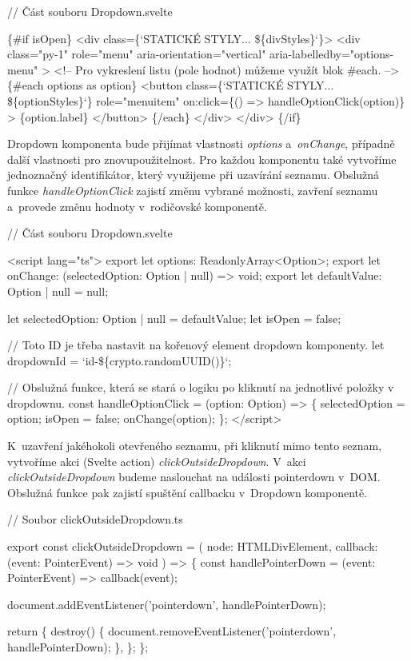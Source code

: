 \begin{prog}
// Část souboru Dropdown.svelte

\{#if isOpen\}
  <div class=\{`STATICKÉ STYLY... \$\{divStyles\}`\}>
    <div 
      class="py-1" role="menu" 
      aria-orientation="vertical" aria-labelledby="options-menu"
    >
      <!-- Pro vykreslení listu (pole hodnot) můžeme využít blok #each. -->
      \{#each options as option\}
        <button
          class=\{`STATICKÉ STYLY... \$\{optionStyles\}`\}
          role="menuitem"
          on:click=\{() => handleOptionClick(option)\}
        >
          \{option.label\}
        </button>
      \{/each\}
    </div>
  </div>
\{/if\}
\end{prog}

Dropdown komponenta bude přijímat vlastnosti \emph{options} a~\emph{onChange}, případně další vlastnosti pro znovupoužitelnost. Pro každou komponentu také vytvoříme jednoznačný identifikátor, který využijeme při uzavírání seznamu.
Obslužná funkce \emph{handleOptionClick} zajistí změnu vybrané možnosti, zavření seznamu a~provede změnu hodnoty v~rodičovské komponentě. 

\begin{prog}
// Část souboru Dropdown.svelte
  
<script lang="ts">
  export let options: ReadonlyArray<Option>;
  export let onChange: (selectedOption: Option | null) => void;
  export let defaultValue: Option | null = null;

  let selectedOption: Option | null = defaultValue;
  let isOpen = false;

  // Toto ID je třeba nastavit na kořenový element dropdown komponenty.
  let dropdownId = `id-\$\{crypto.randomUUID()\}`;

  // Obslužná funkce, která se stará o logiku 
    po kliknutí na jednotlivé položky v dropdownu.
  const handleOptionClick = (option: Option) => \{
    selectedOption = option;
    isOpen = false;
    onChange(option);
  \};
</script>
\end{prog}

K~uzavření jakéhokoli otevřeného seznamu, při kliknutí mimo tento seznam, vytvoříme akci (Svelte action) \emph{clickOutsideDropdown}. 
V~akci \emph{clickOutsideDropdown} budeme naslouchat na události pointerdown v~DOM. Obslužná funkce pak zajistí spuštění callbacku v~Dropdown komponentě.

\begin{prog}
// Soubor clickOutsideDropdown.ts

export const clickOutsideDropdown = (
  node: HTMLDivElement,
  callback: (event: PointerEvent) => void
) => \{
  const handlePointerDown = (event: PointerEvent) => callback(event);

  document.addEventListener('pointerdown', handlePointerDown);

  return \{
    destroy() \{
      document.removeEventListener('pointerdown', handlePointerDown);
    \},
  \};
\};
\end{prog}

